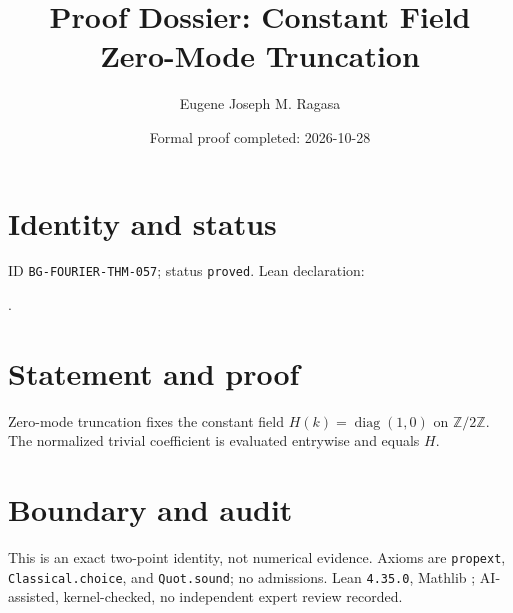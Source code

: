 \documentclass[11pt]{article}
\title{Proof Dossier: Constant Field Zero-Mode Truncation}\author{Eugene Joseph M. Ragasa}\date{Formal proof completed: 2026-10-28}
\begin{document}
\raggedright\maketitle
\section{Identity and status}
ID \texttt{BG-FOURIER-THM-057}; status \texttt{proved}. Lean declaration:
\par{}.
\section{Statement and proof}
Zero-mode truncation fixes the constant field $H(k)=\operatorname{diag}(1,0)$ on $\mathbb Z/2\mathbb Z$. The normalized trivial coefficient is evaluated entrywise and equals $H$.
\section{Boundary and audit}
This is an exact two-point identity, not numerical evidence. Axioms are \texttt{propext}, \texttt{Classical.choice}, and \texttt{Quot.sound}; no admissions. Lean \texttt{4.35.0}, Mathlib {\scriptsize{}}; AI-assisted, kernel-checked, no independent expert review recorded.
\end{document}
